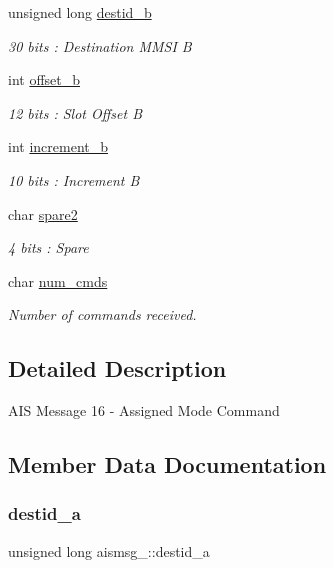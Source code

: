 \begin{DoxyCompactItemize}
unsigned long \mbox{\hyperlink{structaismsg__16_acd56772a6e5c43621f1cfdca23bb7ffd}{destid\+\_\+b}}
\begin{DoxyCompactList}\small\item\em 30 bits \+: Destination M\+M\+SI B \end{DoxyCompactList}\item 
int \mbox{\hyperlink{structaismsg__16_a829a14b0b75c3ca56567675022c66fb3}{offset\+\_\+b}}
\begin{DoxyCompactList}\small\item\em 12 bits \+: Slot Offset B \end{DoxyCompactList}\item 
int \mbox{\hyperlink{structaismsg__16_a3a99bad551b09b4ec8f4f1c34c1d7762}{increment\+\_\+b}}
\begin{DoxyCompactList}\small\item\em 10 bits \+: Increment B \end{DoxyCompactList}\item 
char \mbox{\hyperlink{structaismsg__16_a85c81d792d81c32b331d49d06be1ca78}{spare2}}
\begin{DoxyCompactList}\small\item\em 4 bits \+: Spare \end{DoxyCompactList}\item 
char \mbox{\hyperlink{structaismsg__16_af11883a62a1591d10262e210f83b40b3}{num\+\_\+cmds}}
\begin{DoxyCompactList}\small\item\em Number of commands received. \end{DoxyCompactList}\end{DoxyCompactItemize}


\subsection{Detailed Description}
A\+IS Message 16 -\/ Assigned Mode Command 

\subsection{Member Data Documentation}
\mbox{\label{structaismsg__16_a30a42eb8b0449613fb1d327b36b20617}} 
\subsubsection{\texorpdfstring{destid\+\_\+a}{destid\_a}}
{\footnotesize\ttfamily unsigned long aismsg\+\_\+::destid\+\_\+a}




